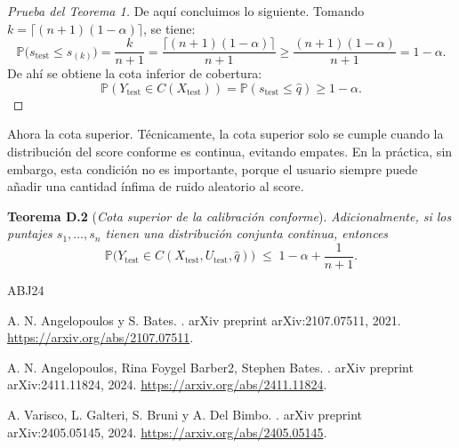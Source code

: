 \documentclass[12pt]{report}
\numberwithin{equation}{section}
\numberwithin{figure}{section}
\numberwithin{table}{section}
\theoremstyle{definition}
\begin{document}
\begin{flushleft}
\begin{proof}[Prueba del Teorema 1]
De aquí concluimos lo siguiente. Tomando $k=\lceil (n+1)(1-\alpha)\rceil$, se tiene:
\begin{equation*}
\mathbb{P}\big(s_{\text{test}}\le s_{(k)}\big)=\frac{k}{n+1} =\frac{\lceil (n+1)(1-\alpha)\rceil}{n+1}\ge\frac{(n+1)(1-\alpha)}{n+1}=1-\alpha.
\end{equation*}
De ahí se obtiene la cota inferior de cobertura:
\begin{equation*}
\mathbb{P}(Y_{\text{test}}\in C(X_{\text{test}}))=\mathbb{P}(s_{\text{test}}\le\hat{q}) \ge 1-\alpha.
\end{equation*}
\end{proof}

\vspace{0.2cm}
Ahora la cota superior. Técnicamente, la cota superior solo se cumple cuando la distribución del score conforme es continua, evitando empates. En la práctica, sin embargo, esta condición no es importante, porque el usuario siempre puede añadir una cantidad ínfima de ruido aleatorio al score.

\vspace{0.3cm}
\noindent\textbf{Teorema D.2} (\textit{Cota superior de la calibración conforme}). \textit{Adicionalmente, si los puntajes $s_1,\dots,s_n$ tienen una distribución conjunta continua, entonces}
\begin{equation*}
\mathbb{P}\big(Y_\text{test} \in C(X_\text{test}, U_\text{test}, \hat{q})\big) \;\le\; 1 - \alpha + \frac{1}{n+1}.
\end{equation*}

\begin{thebibliography}{ABJ24}

A. N. Angelopoulos y S. Bates.
.
\newblock arXiv preprint arXiv:2107.07511, 2021.
\newblock \url{https://arxiv.org/abs/2107.07511}.

A. N. Angelopoulos, Rina Foygel Barber2, Stephen Bates.
.
\newblock arXiv preprint arXiv:2411.11824, 2024.
\newblock \url{https://arxiv.org/abs/2411.11824}.



A. Varisco, L. Galteri, S. Bruni y A. Del Bimbo.
.
\newblock arXiv preprint arXiv:2405.05145, 2024.
\newblock \url{https://arxiv.org/abs/2405.05145}.




\end{thebibliography}
\end{flushleft}
\end{document}
